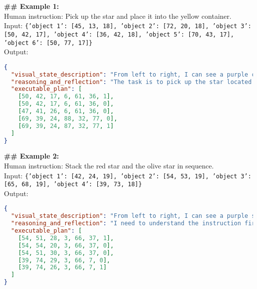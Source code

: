 \begin{tcolorbox}[colback=gray!5!white, colframe=gray!75!black, 
title=In-context examples for EB-Manipulation, boxrule=0.5mm, width=\textwidth, arc=3mm, auto outer arc=true]
\textbf{\#\# Example 1:}\\
Human instruction: Pick up the star and place it into the yellow container.\\
Input: \texttt{\{'object 1': [45, 13, 18], 'object 2': [72, 20, 18], 'object 3': [50, 42, 17], 'object 4': [36, 42, 18], 'object 5': [70, 43, 17], 'object 6': [50, 77, 17]\}}\\
Output:
\begin{lstlisting}[language=json]
{
  "visual_state_description": "From left to right, I can see a purple cylinder at [45, 13, 18], a blue moon at [72, 20, 18], a green star at [50, 42, 17], a purple cube at [36, 42, 18], a yellow container at [70, 43, 17] and a purple container at [50, 77, 17].",
  "reasoning_and_reflection": "The task is to pick up the star located at [50, 42, 17] and place it into the yellow container located at [70, 43, 17]. The plan involves moving the gripper to the star's position, closing the gripper to pick it up, moving to the yellow container's position, and opening the gripper to release the cube into the container.",
  "executable_plan": [
    [50, 42, 17, 6, 61, 36, 1], 
    [50, 42, 17, 6, 61, 36, 0], 
    [47, 41, 26, 6, 61, 36, 0], 
    [69, 39, 24, 88, 32, 77, 0], 
    [69, 39, 24, 87, 32, 77, 1]
  ]
}
\end{lstlisting}
\textbf{\#\# Example 2:}\\
Human instruction: Stack the red star and the olive star in sequence.\\
Input: \texttt{\{'object 1': [42, 24, 19], 'object 2': [54, 53, 19], 'object 3': [65, 68, 19], 'object 4': [39, 73, 18]\}}\\
Output:
\begin{lstlisting}[language=json]
{
  "visual_state_description": "From left to right, I can see a purple star at [42, 24, 19], an olive star at [54, 53, 19], a grey star at [65, 68, 19] and a red star at [39, 73, 18].",
  "reasoning_and_reflection": "I need to understand the instruction first. To stack the objects in sequence, the red star at [39, 73, 18] should be at the bottom and the olive star at [54, 53, 19] should be placed on top. The plan involves moving the gripper to the olive star's position, closing the gripper to pick it up, moving to the top of the red star, and opening the gripper to release the olive star onto the red star.",
  "executable_plan": [
    [54, 51, 28, 3, 66, 37, 1], 
    [54, 54, 20, 3, 66, 37, 0], 
    [54, 51, 30, 3, 66, 37, 0], 
    [39, 74, 29, 3, 66, 7, 0], 
    [39, 74, 26, 3, 66, 7, 1]
  ]
}
\end{lstlisting}
\end{tcolorbox}

